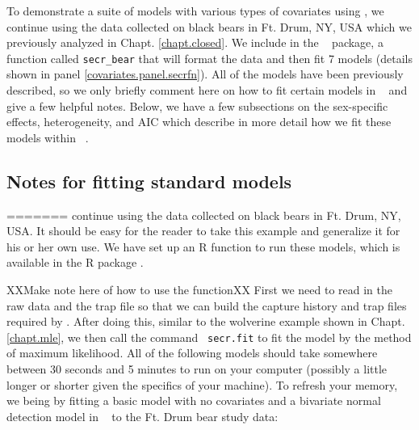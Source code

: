 To demonstrate
a suite of models with various types of covariates using \secr, we
continue using the data collected on black bears in Ft. Drum, NY, USA
which we previously analyzed in Chapt. \ref{chapt.closed}.  We include
in the \scrbook~ package, a function called \mbox{\tt secr_bear} that will 
format the data and then fit 7 models (details shown in panel 
\ref{covariates.panel.secrfn}).  All of the models have been 
previously described, so we only briefly comment here on how to fit
certain models in \secr~ and give a few helpful notes.  Below, 
we have a few subsections on the sex-specific effects, heterogeneity,
and AIC which describe in more detail how we fit these models within
\secr~.

\subsection{Notes for fitting standard models}
=======
continue using the data collected on black bears in Ft. Drum, NY, USA.
It should be easy for the reader to take this example and generalize
it for his or her own use.  We have set up an R function to run these
models, which is available in the R package \scrbook.

XXMake note here of how to use the functionXX
First we need to read in the raw data and
the trap file so that we can build the capture history and trap files
required by \secr.  After doing this, similar to the wolverine example
shown in Chapt. \ref{chapt.mle}, we then call the command \mbox{\tt
  secr.fit}
to fit the model by the method of maximum likelihood.
 All of the following models should take somewhere between 30
seconds and 5 minutes to run on your computer (possibly a little
longer or shorter given the specifics of your machine).  To refresh
your memory, we being by fitting a basic
model with no covariates and a bivariate normal detection model in
\secr~ to the Ft. Drum bear study data:

